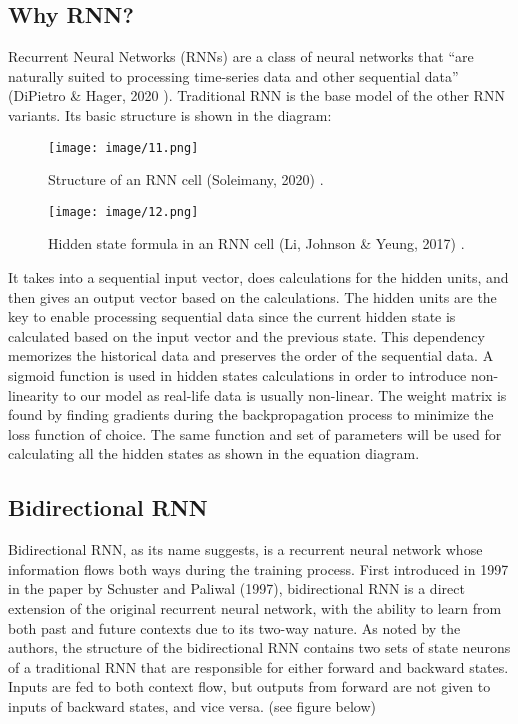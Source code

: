 \documentclass[letterpaper, 10 pt, conference]{ieeeconf}  %
\begin{document}
    \subsection{Why RNN?}
        Recurrent Neural Networks (RNNs) are a class of neural networks that “are naturally suited to processing time-series data and other sequential data” (DiPietro \& Hager, 2020 \cite{zhou_rueckert_fichtinger_2020}). Traditional RNN is the base model of the other RNN variants. Its basic structure is shown in the diagram:
        
        \begin{figure}[thpb]
            \centering
             \texttt{[image: image/11.png]}
            \caption{Structure of an RNN cell (Soleimany, 2020) \cite{soleimany}.}
            \label{figurelabel}
        \end{figure}

        \begin{figure}[thpb]
            \centering
             \texttt{[image: image/12.png]}
            \caption{Hidden state formula in an RNN cell (Li, Johnson \& Yeung, 2017) \cite{li_johnson_yeung}.}
            \label{figurelabel}
        \end{figure}

        It takes into a sequential input vector, does calculations for the hidden units, and then gives an output vector based on the calculations. The hidden units are the key to enable processing sequential data since the current hidden state is calculated based on the input vector and the previous state. This dependency memorizes the historical data and preserves the order of the sequential data. A sigmoid function is used in hidden states calculations in order to introduce non-linearity to our model as real-life data is usually non-linear. The weight matrix is found by finding gradients during the backpropagation process to minimize the loss function of choice. The same function and set of parameters will be used for calculating all the hidden states as shown in the equation diagram.

    \subsection{Bidirectional RNN}
        Bidirectional RNN, as its name suggests, is a recurrent neural network whose information flows both ways during the training process. First introduced in 1997 in the paper by Schuster and Paliwal (1997), bidirectional RNN is a direct extension of the original recurrent neural network, with the ability to learn from both past and future contexts due to its two-way nature. As noted by the authors, the structure of the bidirectional RNN contains two sets of state neurons of a traditional RNN that are responsible for either forward and backward states. Inputs are fed to both context flow, but outputs from forward are not given to inputs of backward states, and vice versa. (see figure below)
        
\end{document}
